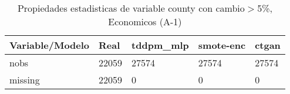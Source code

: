 \begin{table}[H]
\centering
\fontsize{8}{14}\selectfont
\caption{Propiedades estadisticas de variable county con cambio\ensuremath{>}5\%, Economicos (A-1)}
\label{table-stats-economicos-a-1-county-short}
\begin{tabular}{|l|m{10em}|m{10em}|m{10em}|m{10em}|}
\hline
 \rowcolor[gray]{0.8}
Variable/Modelo & Real & tddpm\_mlp & smote-enc & ctgan \\
\hline nobs & 22059 & 27574 & 27574 & 27574 \\
\hline missing & 22059 & 0 & 0 & 0 \\
\hline
\end{tabular}
\end{table}
